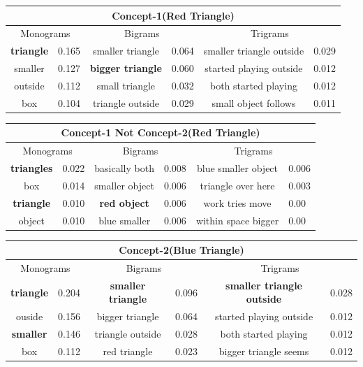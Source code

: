 \def\DevnagVersion{2.15}\documentclass[a4paper, 11pt, notitlepage]{report}
\begin{document}
\begin{center}
\begin{tabular}{||c|l||c|l||c|l||}
\hline
\multicolumn{6}{||c||}{{\bf Concept-1(Red Triangle)}}\\
\hline
\multicolumn{2}{||c||}{Monograms } &\multicolumn{2}{|c||}{Bigrams} &\multicolumn{2}{|c||}{Trigrams} \\
\hline
{\bf triangle} & 0.165 & smaller triangle & 0.064 & smaller triangle outside & 0.029\\
smaller & 0.127 & {\bf bigger triangle} & 0.060 & started playing outside & 0.012\\
outside & 0.112 & small triangle & 0.032 & both started playing & 0.012\\
box & 0.104 & triangle outside & 0.029 & small object follows & 0.011\\
\hline
\end{tabular}
\end{center}

\begin{center}
\begin{tabular}{||c|l||c|l||c|l||}
\hline
\multicolumn{6}{||c||}{{\bf Concept-1 Not Concept-2(Red Triangle)}}\\
\hline
\multicolumn{2}{||c||}{Monograms } &\multicolumn{2}{|c||}{Bigrams} &\multicolumn{2}{|c||}{Trigrams} \\
\hline
{\bf triangles} & 0.022& basically both & 0.008 & blue smaller object & 0.006\\
box & 0.014 & smaller object & 0.006 &triangle over here & 0.003\\
{\bf triangle} & 0.010 & {\bf red object} & 0.006 & work tries move & 0.00\\
object &0.010 & blue smaller & 0.006 & within space bigger & 0.00\\
\hline
\end{tabular}
\end{center}


\begin{center}

\begin{tabular}{||c|l||c|l||c|l||}
\hline
\multicolumn{6}{||c||}{{\bf Concept-2(Blue Triangle)}}\\
\hline
\multicolumn{2}{||c||}{Monograms } &\multicolumn{2}{|c||}{Bigrams} &\multicolumn{2}{|c||}{Trigrams} \\
\hline
{\bf triangle }& 0.204 & {\bf smaller triangle} & 0.096 & {\bf smaller triangle outside} & 0.028\\
ouside & 0.156 & bigger triangle & 0.064 & started playing outside & 0.012\\
{\bf smaller }& 0.146 & triangle outside & 0.028 & both started playing & 0.012\\
box & 0.112 & red triangle & 0.023 & bigger triangle seems & 0.012\\
\hline
\end{tabular}
\end{center}
\end{document}
